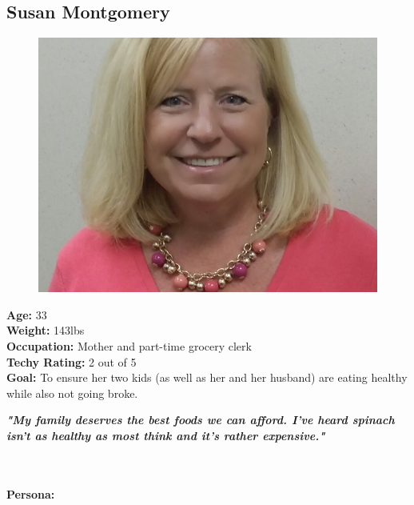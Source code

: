 \documentclass[a4paper,12pt]{article}
\begin{document}
\begin{appendices}
\subsection{Susan Montgomery}
\begin{figure}
  \begin{center}
	\includegraphics[scale=0.23]{Susan.jpg}\\
  \end{center}
\end{figure}
\textbf{Age:} 33\\
\textbf{Weight:} 143lbs\\
\textbf{Occupation:} Mother and part-time grocery clerk\\
\textbf{Techy Rating:} 2 out of 5\\
\textbf{Goal:} To ensure her two kids (as well as her and her husband) are eating healthy while also not going broke.\\
\begin{large}
\textbf{\textit{"My family deserves the best foods we can afford.  I've heard spinach isn't as healthy as most think and it's rather expensive."}}
\end{large}\\\\
\textbf{Persona:}
\newpage

\end{appendices}
\end{document}
